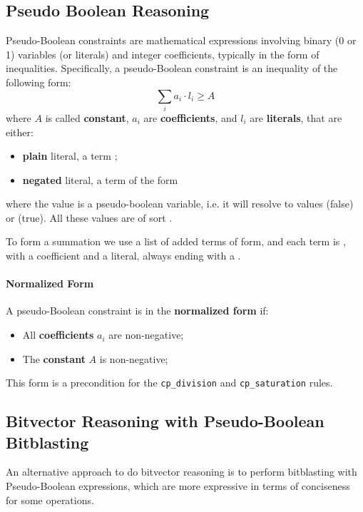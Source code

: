 \subsection{Pseudo Boolean Reasoning}

Pseudo-Boolean constraints are mathematical expressions involving binary (0 or 1) variables
(or literals) and integer coefficients, typically in the form of inequalities.
Specifically, a pseudo-Boolean constraint is an inequality of the following form:
\[
    \sum_i a_i \cdot l_i \geq A
\]
where $A$ is called \textbf{constant}, $a_i$ are \textbf{coefficients},
and $l_i$ are \textbf{literals}, that are either:
\begin{itemize}
    \item \textbf{plain} literal, a term ;
    \item \textbf{negated} literal, a term of the form 
\end{itemize}

where the  value is a pseudo-boolean variable,
i.e. it will resolve to values  (false) or  (true).
All these values are of sort .

To form a summation we use a list of added terms of form,
 and each term is
, with a coefficient and a literal, always ending with a .


\paragraph{Normalized Form}
A pseudo-Boolean constraint is in the \textbf{normalized form} if:
\begin{itemize}
    \item All \textbf{coefficients} $a_i$ are non-negative;
    \item The \textbf{constant} $A$ is non-negative;
\end{itemize}

This form is a precondition for the \texttt{cp\_division} and \texttt{cp\_saturation} rules.

\subsection{Bitvector Reasoning with Pseudo-Boolean Bitblasting}
An alternative approach to do bitvector reasoning is to perform bitblasting with Pseudo-Boolean expressions, which
are more expressive in terms of conciseness for some operations.

